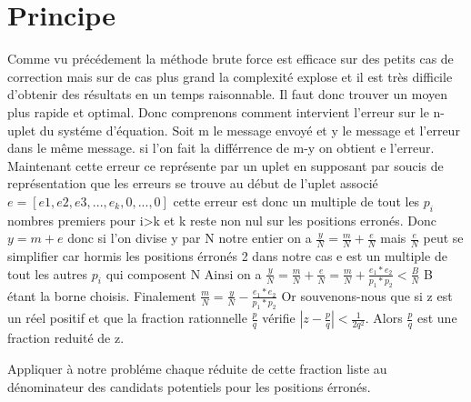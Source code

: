 \documentclass[a4paper, 11pt]{report}
\begin{document}
\section{Principe}
Comme vu précédement la méthode brute force est efficace sur des petits cas de correction mais sur de cas plus grand la complexité explose et il est très difficile d'obtenir des résultats en un temps raisonnable.\newline
Il faut donc trouver un moyen plus rapide et optimal. Donc comprenons comment intervient l'erreur sur le n-uplet du systéme d'équation.\newline
Soit m le message envoyé et y le message et l'erreur dans le même message. si l'on fait la différrence de m-y on obtient e l'erreur.
Maintenant cette erreur ce représente par un uplet en supposant par soucis de représentation que les erreurs se trouve au début de l'uplet associé
$e = [e1,e2,e3,...,e_k,0,...,0]$ cette erreur est donc un multiple de tout les $p_i$ nombres premiers pour i>k et k  reste non nul sur les positions erronés.\newline
Donc $y = m + e$ donc si l'on divise y par N notre entier on a $\frac{y}{N}=\frac{m}{N}+\frac{e}{N}$\newline
mais $\frac{e}{N}$ peut se simplifier car hormis les positions érronés 2 dans notre cas e est un multiple de tout les autres $p_i$ qui composent N\newline
Ainsi on a  $\frac{y}{N}=\frac{m}{N}+\frac{e}{N}=\frac{m}{N}+ \frac{e_1 * e_2}{p_1 * p_2 } <\frac{B}{N} $    B étant la borne choisis.\newline
Finalement $\frac{m}{N}=\frac{y}{N} - \frac{e_1 * e_2}{p_1 * p_2 } $ \newline
\newline
Or souvenons-nous que si z est un réel positif et que la fraction rationnelle $\frac{p}{q}$
vérifie $ \left| z - \frac{p}{q} \right| < \frac{1}{2q^2} $. 
Alors $\frac{p}{q}$ est une fraction reduité de z.\newline
\newline

Appliquer à notre probléme chaque réduite de cette fraction liste au dénominateur des candidats potentiels pour les positions érronés.\newline
\end{document}
